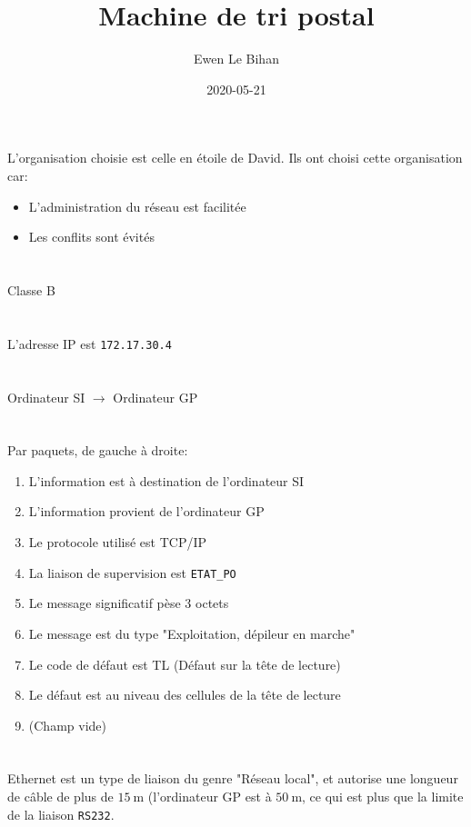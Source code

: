 \documentclass{article}
\title{Machine de tri postal}
\author{Ewen Le Bihan}
\date{2020-05-21}
\begin{document}
\maketitle

\section{}

L'organisation choisie est celle en étoile de David. Ils ont choisi cette organisation car:

\begin{itemize}
	\item L'administration du réseau est facilitée
	\item Les conflits sont évités
\end{itemize}

\section{}

Classe B

\section{}

L'adresse IP est \texttt{172.17.30.4}

\section{}

Ordinateur SI $\to $ Ordinateur GP 

\section{}

Par paquets, de gauche à droite:

\begin{enumerate}
	\item L'information est à destination de l'ordinateur SI
	\item L'information provient de l'ordinateur GP
	\item Le protocole utilisé est TCP/IP
	\item La liaison de supervision est \texttt{ETAT\_PO}
	\item Le message significatif pèse 3 octets
	\item Le message est du type "Exploitation, dépileur en marche"
	\item Le code de défaut est TL (Défaut sur la tête de lecture)
	\item Le défaut est au niveau des cellules de la tête de lecture
	\item (Champ vide)
\end{enumerate}

\section{}

Ethernet est un type de liaison du genre "Réseau local", et autorise une longueur
de câble de plus de $\SI{15}{\meter}$ (l'ordinateur GP est à $\SI{50}{\meter}$, ce 
qui est plus que la limite de la liaison \texttt{RS232}.
\end{document}
